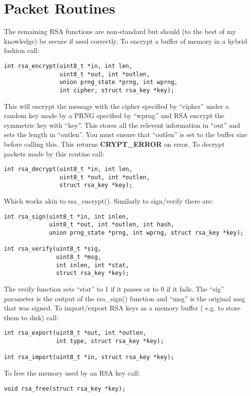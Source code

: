\documentclass{book}
\begin{document}
\section{Packet Routines}
The remaining RSA functions are non-standard but should (to the best of my knowledge) be secure if used correctly.  To
encrypt a buffer of memory in a hybrid fashion call:
\begin{verbatim}
int rsa_encrypt(uint8_t *in, int len, 
                uint8_t *out, int *outlen,
                union prng_state *prng, int wprng, 
                int cipher, struct rsa_key *key);
\end{verbatim}
This will encrypt the message with the cipher specified by ``cipher'' under a random key made by a PRNG specified by
``wprng'' and RSA encrypt the symmetric key with ``key''.  This stores all the relevent information in ``out'' and sets
the length in ``outlen''.  You must ensure that ``outlen'' is set to the buffer size before calling this.  This returns
{\bf CRYPT\_ERROR} on error.  To decrypt packets made by this routine call:
\begin{verbatim}
int rsa_decrypt(uint8_t *in, int len, 
                uint8_t *out, int *outlen, 
                struct rsa_key *key);
\end{verbatim}
Which works akin to rsa\_encrypt().  Similarly to sign/verify there are:
\begin{verbatim}
int rsa_sign(uint8_t *in, int inlen, 
             uint8_t *out, int *outlen, int hash, 
             union prng_state *prng, int wprng, struct rsa_key *key);

int rsa_verify(uint8_t *sig, 
               uint8_t *msg, 
               int inlen, int *stat, 
               struct rsa_key *key);
\end{verbatim}

The verify function sets ``stat'' to 1 if it passes or to 0 if it fails.  The ``sig'' parameter is the output of the
rsa\_sign() function and ``msg'' is the original msg that was signed.  To import/export RSA keys as a memory buffer (
e.g. to store them to disk) call:
\begin{verbatim}
int rsa_export(uint8_t *out, int *outlen, 
               int type, struct rsa_key *key);

int rsa_import(uint8_t *in, struct rsa_key *key);
\end{verbatim}

To free the memory used by an RSA key call:
\begin{verbatim}
void rsa_free(struct rsa_key *key);
\end{verbatim}

\backmatter
\appendix

\end{document}
